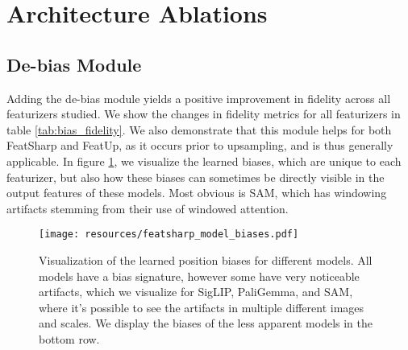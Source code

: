 \section{Architecture Ablations}

\subsection{De-bias Module}

Adding the de-bias module yields a positive improvement in fidelity across all featurizers studied. We show the changes in fidelity metrics for all featurizers in table \ref{tab:bias_fidelity}. We also demonstrate that this module helps for both FeatSharp and FeatUp, as it occurs prior to upsampling, and is thus generally applicable. In figure \ref{fig:model-biases}, we visualize the learned biases, which are unique to each featurizer, but also how these biases can sometimes be directly visible in the output features of these models. Most obvious is SAM, which has windowing artifacts stemming from their use of windowed attention.

\begin{table}[h]
    \centering
    \caption{The delta change in multi-view consistency fidelity when applying the learned de-bias buffer. Positive values mean that the fidelity has improved, which is true for every model and upsampler tested.}
    \label{tab:bias_fidelity}
\end{table}

\begin{figure}[h]
    \centering
    \texttt{[image: resources/featsharp\_model\_biases.pdf]}
    \vspace{-7mm}
    \caption{Visualization of the learned position biases for different models. All models have a bias signature, however some have very noticeable artifacts, which we visualize for SigLIP, PaliGemma, and SAM, where it's possible to see the artifacts in multiple different images and scales. We display the biases of the less apparent models in the bottom row.}
    \label{fig:model-biases}
\end{figure}

